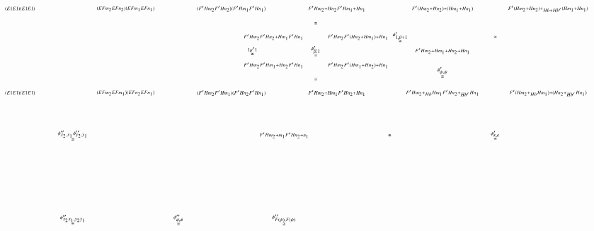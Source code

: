 \documentclass[reqno]{amsart}
\begin{document}
\[
\hspace{-1.2in}
\begin{tikzpicture}[scale=1.5]
\node (1) at (1.25,-2) {$\scriptscriptstyle{\stackrel{\phi''_{x_2x_1,y_2y_1}} \cong}$};
\node (2) at (3.75,-2) {$\scriptscriptstyle{\stackrel{\phi''_{\phi,\phi}} \cong}$};
\node (3) at (6.25,-2) {$\scriptscriptstyle{\stackrel{\phi''_{F(\psi),F(\psi)}} \cong}$};
\node (4) at (1.25,0) {$\scriptscriptstyle{\stackrel{\phi''_{x_2,x_1} \phi''_{y_2,y_1}} \cong}$};
\node (5) at (8.75,0) {$\scriptscriptstyle{\cong}$};
\node (6) at (11.25,0) {$\scriptscriptstyle{\stackrel{\phi'_{\kappa,\kappa}} \cong}$};
\node (7) at (5.5,2) {$\scriptscriptstyle{\stackrel{1 \mu' 1} \cong}$};
\node (8) at (7,2) {$\scriptscriptstyle{\stackrel{\phi'_{\beta,1}} \cong}$};
\node (9) at (7,2.66) {$\scriptscriptstyle{\cong}$};
\node (10) at (7,1.33) {$\scriptscriptstyle{\cong}$};
\node (11) at (9,2.33) {$\scriptscriptstyle{\stackrel{\phi'_{1,\beta+1}} \cong}$};
\node (12) at (10,1.5) {$\scriptscriptstyle{\stackrel{\phi'_{\psi,\psi}} \cong}$};
\node (13) at (11.25,2.33) {$\scriptscriptstyle{\cong}$};

\node (A1) at (0,3) {$\scriptscriptstyle{(E1 E1)  (E1  E1)}$};
\node (A2) at (2.5,3) {$\scriptscriptstyle{(EFm_2  EFn_2)  (EFm_1  EFn_1)}$};
\node (A3) at (5,3) {$\scriptscriptstyle{(F'Hm_2  F'Hn_2) (F'Hm_1  F'Hn_1)}$};
\node (A4) at (7.5,3) {$\scriptscriptstyle{F'Hm_2+Hn_2  F'Hm_1+Hn_1}$};
\node (A5) at (10,3) {$\scriptscriptstyle{F'(Hm_2+Hn_2)+(Hm_1+Hn_1)}$};
\node (A6) at (12.5,3) {$\scriptscriptstyle{F'(Hm_2+Hn_2)+_{Hb+Hb'}(Hm_1+Hn_1)}$};

\node (X1) at (6,2.33) {$\scriptscriptstyle{F'Hm_2 F'Hn_2+Hm_1 F'Hn_1}$};
\node (X2) at (8,2.33) {$\scriptscriptstyle{F'Hm_2 F'(Hn_2+Hm_1)+Hn_1}$};
\node (X3) at (6,1.66) {$\scriptscriptstyle{F'Hm_2 F'Hm_1+Hn_2 F'Hn_1}$};
\node (X4) at (8,1.66) {$\scriptscriptstyle{F'Hm_2 F'(Hm_1+Hn_2)+Hn_1}$};
\node (X5) at (10,2) {$\scriptscriptstyle{F'Hm_2+Hm_1+Hn_2+Hn_1}$};

\node (B1) at (0,1) {$\scriptscriptstyle{(E1 E1) (E1 E1)}$};
\node (B2) at (2.5,1) {$\scriptscriptstyle{(EFm_2 EFm_1)(EFn_2 EFn_1)}$};
\node (B3) at (5,1) {$\scriptscriptstyle{(F'Hm_2 F'Hm_1)(F'Hn_2 F'Hn_1)}$};
\node (B4) at (7.5,1) {$\scriptscriptstyle{F'Hm_2+Hm_1 F'Hn_2+Hn_1}$};
\node (B5) at (10,1) {$\scriptscriptstyle{F'Hm_2+_{Hb}Hm_1 F'Hn_2+_{Hb'}Hn_1}$};
\node (B6) at (12.5,1) {$\scriptscriptstyle{F'(Hm_2+_{Hb}Hm_1)+(Hn_2+_{Hb'}Hn_1)}$};

\node (B') at (6.25,0) {$\scriptscriptstyle{F'Hm_2+m_1 F'Hn_2+n_1}$};


\end{tikzpicture}\]
\end{document}
